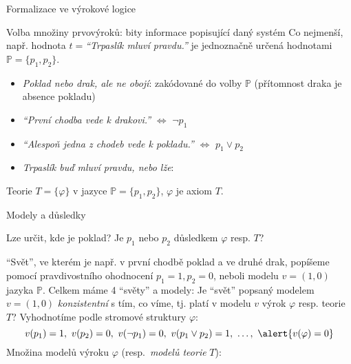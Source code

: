 \documentclass{beamer}
\begin{document}
\begin{frame}{Formalizace ve výrokové logice}

    Volba množiny prvovýroků: bity informace popisující daný systém
    Co nejmenší, např. hodnota $t=${\it ``Trpaslík mluví pravdu.''} je jednoznačně určená hodnotami $\mathbb P=\{p_1,p_2\}$.
    \begin{itemize}
        \item {\it Poklad nebo drak, ale ne obojí}: zakódované do volby $\mathbb P$ (přítomnost draka je absence pokladu)
        \item {\it ``První chodba vede k drakovi.''} $\Leftrightarrow$ \alert{$\neg p_1$}
        \item {\it ``Alespoň jedna z chodeb vede k pokladu.''} $\Leftrightarrow$ \alert{$p_1 \lor p_2$}
        \item {\it Trpaslík buď mluví pravdu, nebo lže}:
    \end{itemize}

    \alert{Teorie} $T=\{ \varphi \}$ v \alert{jazyce} $\mathbb P=\{p_1,p_2\}$, $\varphi$ je \alert{axiom} $T$.

\end{frame}


\begin{frame}{Modely a důsledky}

    Lze určit, kde je poklad? Je $p_1$ nebo $p_2$ \alert{důsledkem} $\varphi$ resp. $T$?    

    \alert{``Svět''}, ve kterém je např. v první chodbě poklad a ve druhé drak, popíšeme pomocí \alert{pravdivostního ohodnocení} $p_1=1,p_2=0$, neboli \alert{modelu} $v=(1,0)$ jazyka $\mathbb P$. Celkem máme 4 ``světy'' a modely:
    Je ``svět'' popsaný modelem $v = (1,0)$ \emph{konzistentní} s tím, co víme, tj. \alert{platí} v modelu $v$ výrok $\varphi$ resp. teorie $T$? Vyhodnotíme podle stromové struktury $\varphi$:
    $$
    v(p_1) = 1,\ v(p_2) = 0,\ v(\neg p_1) = 0,\ v(p_1 \lor p_2)=1,\ \dots,\ \alert{v(\varphi)=0}
    $$
    Množina \alert{modelů výroku} \( \varphi \) (resp.\ \emph{modelů teorie} \( T \)):
    
\end{frame}
\end{document}
